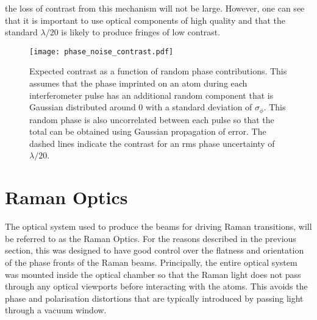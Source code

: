the loss of contrast from this mechanism will not be large. However,
one can see that it is important to use optical components of high
quality and that the standard $\lambda/20$ is likely to produce
fringes of low contrast.
\begin{figure}[htbp]
	\centering
	\texttt{[image: phase\_noise\_contrast.pdf]}
  \caption[Expected fringe contrast as a function of random phase
  contributions.]{Expected contrast as a function of random phase contributions. This
		assumes that the phase imprinted on an atom during each interferometer pulse
		has an additional random component that is Gaussian distributed around 0
		with a standard deviation of \(\sigma_\phi\). This random phase is also
		uncorrelated between each pulse so that the total can be obtained using
		Gaussian propagation of error. The dashed lines indicate the
    contrast for an rms phase uncertainty of \(\lambda/20\).}
	\label{fig:raman_phasenoise}
\end{figure}
\par\noindent
\section{Raman Optics}\label{sec:setup_ramanoptics}
The optical system used to produce the beams for driving Raman transitions,
will be referred to as the Raman Optics. For the reasons described in
the previous section, this was designed to
have good control over the flatness and orientation of the phase
fronts of the Raman beams. Principally, the entire
optical system was mounted inside the optical chamber so that the Raman light
does not pass through any optical viewports before interacting with the atoms.
This avoids the phase and polarisation distortions that are typically
introduced by passing light through a vacuum window.
